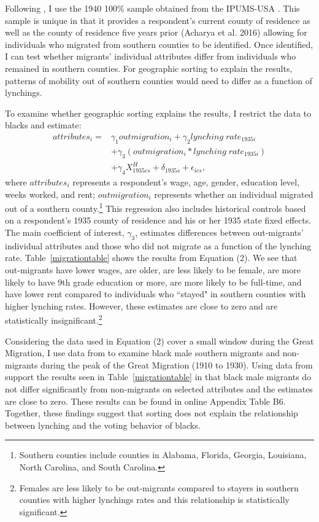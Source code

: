 \documentclass[AEJ, finalmode]{AEA}
\begin{document}
Following , I use the 1940 100\% sample obtained from the IPUMS-USA \cite{ipumsacs}. This sample is unique in that it provides a respondent's current county of residence as well as the county of residence five years prior (Acharya et al. 2016) allowing for individuals who migrated from southern counties to be identified. Once identified, I can test whether migrants' individual attributes differ from individuals who remained in southern counties. For geographic sorting to explain the results, patterns of mobility out of southern counties would need to differ as a function of lynchings.   

To examine whether geographic sorting explains the results, I restrict the data to blacks and estimate:
\begin{equation}
\begin{aligned}
attributes_{i} = & \gamma_{1}outmigration_{i} + \gamma_{2}lynching\;rate_{1935i} \\ & +  \gamma_{3}(outmigration_{i}*lynching\;rate_{1935i}) \\ & + \gamma_{4}X^H_{1935cs} + \delta_{1935s} +  \epsilon_{ics},
\end{aligned}
\label{migrationequ}
\end{equation} 
where $attributes_{i}$ represents a respondent's wage, age, gender, education level, weeks worked, and rent; $outmigration_{i}$ represents whether an individual migrated out of a southern county.\footnote{Southern counties include counties in Alabama, Florida, Georgia, Louisiana, North Carolina, and South Carolina.} This regression also includes historical controls based on a respondent's 1935 county of residence and his or her 1935 state fixed effects. The main coefficient of interest, $\gamma_{3}$, estimates differences between out-migrants' individual attributes and those who did not migrate as a function of the lynching rate. Table~\ref{migrationtable} shows the results from Equation (2). We see that out-migrants have lower wages, are older, are less likely to be female, are more likely to have 9th grade education or more, are more likely to be full-time, and have lower rent compared to individuals who ``stayed" in southern counties with higher lynching rates. However, these estimates are close to zero and are statistically insignificant.\footnote{Females are less likely to be out-migrants compared to stayers in southern counties with higher lynchings rates and this relationship is statistically significant.} 

Considering the data used in Equation (2) cover a small window during the Great Migration, I use data from  to examine black male southern migrants and non-migrants during the peak of the Great Migration (1910 to 1930). Using data from  support the results seen in Table~\ref{migrationtable} in that black male migrants do not differ significantly from non-migrants on selected attributes and the estimates are close to zero. These results can be found in online Appendix Table B6. Together, these findings suggest that sorting does not explain the relationship between lynching and the voting behavior of blacks. 
\end{document}
